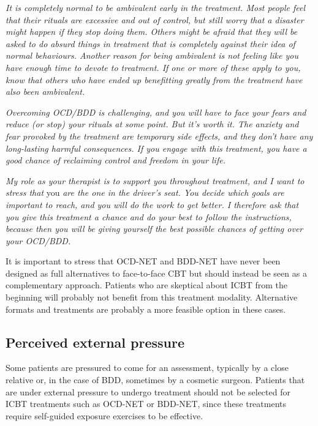 \documentclass[]{book}
\theoremstyle{definition}
\theoremstyle{definition}
\theoremstyle{definition}
\theoremstyle{remark}
\begin{document}
\emph{It is completely normal to be ambivalent early in the treatment.
Most people feel that their rituals are excessive and out of control,
but still worry that a disaster might happen if they stop doing them.
Others might be afraid that they will be asked to do absurd things in
treatment that is completely against their idea of normal behaviours.
Another reason for being ambivalent is not feeling like you have enough
time to devote to treatment. If one or more of these apply to you, know
that others who have ended up benefitting greatly from the treatment
have also been ambivalent.}

\emph{Overcoming OCD/BDD is challenging, and you will have to face your
fears and reduce (or stop) your rituals at some point. But it's worth
it. The anxiety and fear provoked by the treatment are temporary side
effects, and they don't have any long-lasting harmful consequences. If
you engage with this treatment, you have a good chance of reclaiming
control and freedom in your life.}

\emph{My role as your therapist is to support you throughout treatment,
and I want to stress that} you \emph{are the one in the driver's seat.
You decide which goals are important to reach, and you will do the work
to get better. I therefore ask that you give this treatment a chance and
do your best to follow the instructions, because then you will be giving
yourself the best possible chances of getting over your OCD/BDD.}

It is important to stress that OCD-NET and BDD-NET have never been
designed as full alternatives to face-to-face CBT but should instead be
seen as a complementary approach. Patients who are skeptical about ICBT
from the beginning will probably not benefit from this treatment
modality. Alternative formats and treatments are probably a more
feasible option in these cases.

\hypertarget{perceived-external-pressure}{%
\subsection{Perceived external
pressure}\label{perceived-external-pressure}}

Some patients are pressured to come for an assessment, typically by a
close relative or, in the case of BDD, sometimes by a cosmetic surgeon.
Patients that are under external pressure to undergo treatment should
not be selected for ICBT treatments such as OCD-NET or BDD-NET, since
these treatments require self-guided exposure exercises to be effective.
\end{document}
